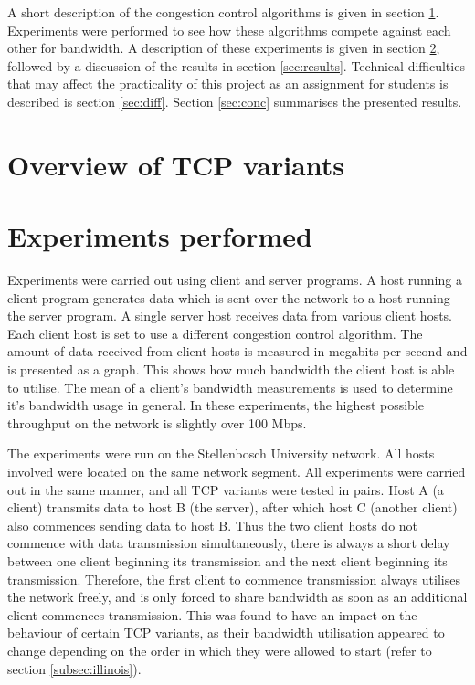 \documentclass[11pt,a4paper,twocolumn]{article}
\begin{document}
A short description of the congestion control algorithms is given in section \ref{sec:tcpoverview}. Experiments were
performed to see how these algorithms compete against each other for bandwidth. A description
of these experiments is given in section \ref{sec:exp}, followed by a discussion of the results in section \ref{sec:results}.
Technical difficulties that may affect the practicality of this project as an assignment for students is described
is section \ref{sec:diff}. Section \ref{sec:conc} summarises the presented results.

\section{Overview of TCP variants}
\label{sec:tcpoverview}

\section{Experiments performed}
\label{sec:exp}
Experiments were carried out using client and server programs. A host running a client program generates data which is sent over the
network to a host running the server program. A single server host receives data from various client hosts. Each client host is set to use a different congestion control algorithm.
The amount of data received from client hosts is measured in megabits per second and is presented as a graph. This shows how much bandwidth the client host is able to utilise.
The mean of a client's bandwidth measurements is used to determine it's bandwidth usage in general. In these experiments, the highest possible throughput on the
network is slightly over 100 Mbps.

The experiments were run on the Stellenbosch University network. All hosts involved were located on the same network segment. All experiments
were carried out in the same manner, and all TCP variants were tested in pairs. Host A (a client) transmits data to host B (the server), after which host C (another client) also commences
sending data to host B. Thus the two client hosts do not commence with data transmission simultaneously, there is always a short delay between
one client beginning its transmission and the next client beginning its transmission. Therefore, the first client to commence transmission
always utilises the network freely, and is only forced to share bandwidth as soon as an additional client commences transmission.
This was found to have an impact on the behaviour of certain TCP variants, as their bandwidth utilisation appeared to change depending
on the order in which they were allowed to start (refer to section \ref{subsec:illinois}).
\end{document}

